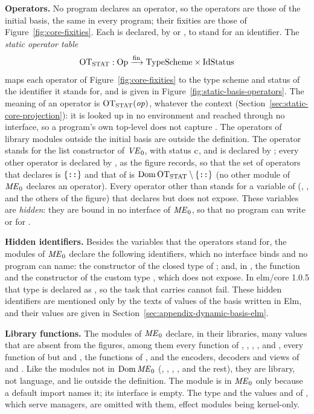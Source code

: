 \textbf{Operators.} No program declares an operator, so the operators are
those of the initial basis, the same in every program; their fixities are
those of Figure~\ref{fig:core-fixities}. Each is declared, by  or
, to stand for an identifier. The \emph{static operator table}
\[
  \mathrm{OT}_{\mathrm{STAT}} : \mathrm{Op} \xrightarrow{\mathrm{fin}} \mathrm{TypeScheme} \times \mathrm{IdStatus}
\]
maps each operator of Figure~\ref{fig:core-fixities} to the type scheme and
status of the identifier it stands for, and is given in
Figure~\ref{fig:static-basis-operators}. The meaning of an operator is
$\mathrm{OT}_{\mathrm{STAT}}(\mathit{op})$, whatever the context (Section~\ref{sec:static-core-projection}):
it is looked up in no environment and reached through no interface, so a
program's own top-level  does not capture \kw{+}. The operators of
library modules outside the initial basis are outside the definition.
The operator \kw{::} stands for the list constructor \kw{::} of $\mathit{VE}_0$, with
status $\mathrm{c}$, and is declared by ; every other operator is declared
by , as the figure records, so that the set of operators that
 declares is $\{\textnormal{\texttt{::}}\}$ and that of  is
$\mathrm{Dom}\,\mathrm{OT}_{\mathrm{STAT}}\setminus\{\textnormal{\texttt{::}}\}$ (no other module of $\mathit{ME}_0$ declares an
operator). Every operator other than \kw{::} stands for a variable of 
(, ,  and the others of the figure) that 
declares but does not expose. These variables are \emph{hidden}: they are
bound in no interface of $\mathit{ME}_0$, so that no program can write
 or  for \kw{(+)}.

\textbf{Hidden identifiers.} Besides the variables that the operators stand
for, the modules of $\mathit{ME}_0$ declare the following identifiers, which no
interface binds and no program can name: the constructor  of
the closed type  of ; and, in , the function
 and the constructor  of the custom type ,
which  does not expose. In elm/core 1.0.5 that type is declared as
, so the task that 
carries cannot fail. These hidden identifiers are mentioned only by the texts of
values of the basis written in Elm, and their values are given in
Section~\ref{sec:appendix-dynamic-basis-elm}. %

\textbf{Library functions.} The modules of $\mathit{ME}_0$ declare, in their
libraries, many values that are absent from the figures, among them every
function of , , , ,
 and , every function of  but  and , the
functions of , and the encoders,
decoders and views of  and . Like the modules not in
$\mathrm{Dom}\,\mathit{ME}_0$ (, , , ,
 and the rest), they are library, not language, and lie outside
the definition. The module  is in $\mathit{ME}_0$ only because a default
import names it; its interface is empty. The type  and the values
 and  of , which serve managers,
are omitted with them, effect modules being kernel-only. %

